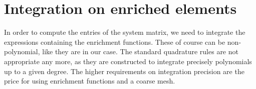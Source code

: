 \documentclass[preprint,12pt]{elsarticle}
\begin{document}
% 
% 

\section{Integration on enriched elements}
\label{sec:integration}
In order to compute the entries of the system matrix, %
we need to integrate
the expressions containing the enrichment functions. These of course can be non-polynomial, like they are 
in our case. The standard quadrature rules are not appropriate any more, as they are constructed to integrate 
precisely polynomials up to a given degree. The higher requirements on integration precision
are the price for using enrichment functions and a coarse mesh.
\end{document}
